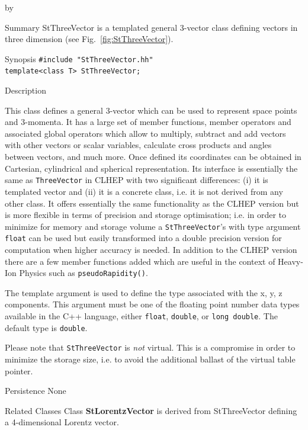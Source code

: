 \documentclass[twoside]{article}
\newcommand{\comp}[1]{\texttt{#1}}%
\newcommand{\entrylabel}[1]{\mbox{\textbf{{#1}}}\hfil}%
\newenvironment{entry}
{\begin{list}{}%
    {\renewcommand{\makelabel}{\entrylabel}%
     \setlength{\labelwidth}{90pt}%
     \setlength{\leftmargin}{\labelwidth}
     \advance\leftmargin by \labelsep%
      }%
    }%
  {\end{list}}
\newcommand{\Entrylabel}[1]%
{\raisebox{0pt}[1ex][0pt]{\makebox[\labelwidth][l]%
    {\parbox[t]{\labelwidth}{\hspace{0pt}\textbf{{#1}}}}}}
\newenvironment{Entry}%
{\renewcommand{\entrylabel}{\Entrylabel}\begin{entry}}%
  {\end{entry}}
\begin{document}
\begin{description}
\begin{Entry}
\item[Summary]
    StThreeVector is a templated general 3-vector class defining
    vectors in three dimension (see Fig.~\ref{fig:StThreeVector}).

\item[Synopsis]
    \verb+#include "StThreeVector.hh"+ \\
    \verb+template<class T> StThreeVector;+
    
    
\item[Description]   
    
    This class defines a general 3-vector which can be used to
    represent space points and 3-momenta.  It has a large set of
    member functions, member operators and associated global operators
    which allow to multiply, subtract and add vectors with other
    vectors or scalar variables, calculate cross products and angles
    between vectors, and much more. Once defined its coordinates can
    be obtained in Cartesian, cylindrical and spherical
    representation.  Its interface is essentially the same as
    \comp{ThreeVector} in CLHEP  with two significant differences:
    (i) it is templated vector and (ii) it is a concrete class, i.e.
    it is not derived from any other class.  It offers essentially the
    same functionality as the CLHEP version but is more flexible in
    terms of precision and storage optimisation; i.e. in order to
    minimize for memory and storage volume a \comp{StThreeVector}'s
    with type argument \comp{float} can be used but easily
    transformed into a double precision version for computation when
    higher accuracy is needed.  In addition to the CLHEP version there
    are a few member functions added which are useful in the context
    of Heavy-Ion Physics such as \comp{pseudoRapidity()}.

    The template argument is used to define the type associated with
    the x, y, z components. This argument must be one of the floating
    point number data types available in the C++ language, either
    \comp{float}, \comp{double}, or \comp{long double}. The
    default type is \comp{double}.
    
    Please note that \comp{StThreeVector} is {\em not} virtual. This
    is a compromise in order to minimize the storage size, i.e. to
    avoid the additional ballast of the virtual table pointer.
\item[Persistence]
    None

\item[Related Classes]
    Class {\bf StLorentzVector} 
    is derived from StThreeVector
    defining a 4-dimensional Lorentz vector. 


\end{Entry}
\end{description}
\end{document}
